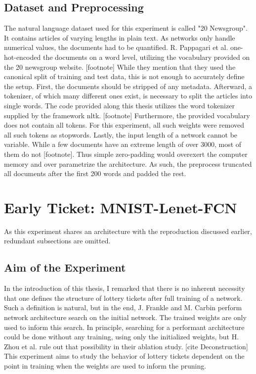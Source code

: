 \subsection*{Dataset and Preprocessing}
The natural language dataset used for this experiment is called "20 Newsgroup". It contains articles of varying lengths in plain text. As networks only handle numerical values, the documents had to be quantified. R. Pappagari et al. one-hot-encoded the documents on a word level, utilizing the vocabulary provided on the 20 newsgroup website. [footnote] 
While they mention that they used the canonical split of training and test data, this is not enough to accurately define the setup. First, the documents should be stripped of any metadata. Afterward, a tokenizer, of which many different ones exist, is necessary to split the articles into single words. The code provided along this thesis utilizes the word tokenizer supplied by the framework nltk. [footnote] Furthermore, the provided vocabulary does not contain all tokens. For this experiment, all such weights were removed all such tokens as stopwords. 
Lastly, the input length of a network cannot be variable. While a few documents have an extreme length of over 3000, most of them do not [footnote]. Thus simple zero-padding would overexert the computer memory and over parametrize the architecture. As such, the preprocess truncated all documents after the first 200 words and padded the rest.

\section{Early Ticket: MNIST-Lenet-FCN}
As this experiment shares an architecture with the reproduction discussed earlier, redundant subsections are omitted. 
\subsection*{Aim of the Experiment}
In the introduction of this thesis, I remarked that there is no inherent necessity that one defines the structure of lottery tickets after full training of a network. Such a definition is natural, but in the end, J. Frankle and M. Carbin perform network architecture search on the initial network. The trained weights are only used to inform this search.
In principle, searching for a performant architecture could be done without any training, using only the initialized weights, but H. Zhou et al. rule out that possibility in their ablation study. [cite Deconstruction]
This experiment aims to study the behavior of lottery tickets dependent on the point in training when the weights are used to inform the pruning.
